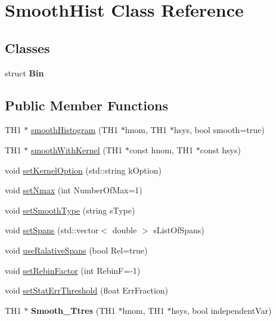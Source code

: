\hypertarget{classSmoothHist}{
\section{SmoothHist Class Reference}
\label{classSmoothHist}
}
\subsection*{Classes}
\begin{DoxyCompactItemize}
\item 
struct {\bfseries Bin}
\end{DoxyCompactItemize}
\subsection*{Public Member Functions}
\begin{DoxyCompactItemize}
\item 
TH1 $\ast$ \hyperlink{classSmoothHist_a72c5eb8c25359a8b6bcf9d2e6a03158a}{smoothHistogram} (TH1 $\ast$hnom, TH1 $\ast$hsys, bool smooth=true)
\item 
TH1 $\ast$ \hyperlink{classSmoothHist_af5f8c1ba0805aa4a6ec8ebb85573aa11}{smoothWithKernel} (TH1 $\ast$const hnom, TH1 $\ast$const hsys)
\item 
void \hyperlink{classSmoothHist_a400870adb6f812cfb5fcba450d645703}{setKernelOption} (std::string kOption)
\item 
void \hyperlink{classSmoothHist_afa0d953e55d55dc4216fe508c03b7c44}{setNmax} (int NumberOfMax=1)
\item 
void \hyperlink{classSmoothHist_abf903800d8531bb255bd4f90bba39add}{setSmoothType} (string sType)
\item 
void \hyperlink{classSmoothHist_a0f94bf39e2074d3726d322358296f8b9}{setSpans} (std::vector$<$ double $>$ sListOfSpans)
\item 
void \hyperlink{classSmoothHist_af8d7e0514a1abe58c503548c555134e7}{useRalativeSpans} (bool Rel=true)
\item 
void \hyperlink{classSmoothHist_a547095b0168773a9c913001f2426a7b2}{setRebinFactor} (int RebinF=-\/1)
\item 
void \hyperlink{classSmoothHist_afb5c5cf363ecd6ca1f908f14c2082e1b}{setStatErrThreshold} (float ErrFraction)
\item 
\hypertarget{classSmoothHist_a79c9f91f21670e5e06c92f9a074aeb87}{
TH1 $\ast$ {\bfseries Smooth\_\-Ttres} (TH1 $\ast$hnom, TH1 $\ast$hsys, bool independentVar)}
\label{classSmoothHist_a79c9f91f21670e5e06c92f9a074aeb87}

\end{DoxyCompactItemize}


